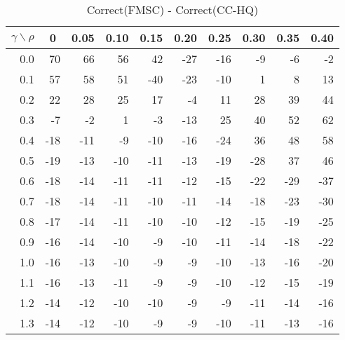 \documentclass[12pt]{article}
\begin{document}
%
\begin{table}[!tbp]
\caption{Correct(FMSC) - Correct(CC-HQ)}
 \begin{center}
 \begin{tabular}{r|rrrrrrrrr}\hline\hline
\multicolumn{1}{c|}{$\gamma\backslash\rho$}&\multicolumn{1}{c}{0}&\multicolumn{1}{c}{0.05}&\multicolumn{1}{c}{0.10}&\multicolumn{1}{c}{0.15}&\multicolumn{1}{c}{0.20}&\multicolumn{1}{c}{0.25}&\multicolumn{1}{c}{0.30}&\multicolumn{1}{c}{0.35}&\multicolumn{1}{c}{0.40}\tabularnewline
\hline



0.0& 70& 66& 56& 42&-27&-16& -9& -6& -2\tabularnewline
0.1& 57& 58& 51&-40&-23&-10&  1&  8& 13\tabularnewline
0.2& 22& 28& 25& 17& -4& 11& 28& 39& 44\tabularnewline
0.3& -7& -2&  1& -3&-13& 25& 40& 52& 62\tabularnewline
0.4&-18&-11& -9&-10&-16&-24& 36& 48& 58\tabularnewline
0.5&-19&-13&-10&-11&-13&-19&-28& 37& 46\tabularnewline
0.6&-18&-14&-11&-11&-12&-15&-22&-29&-37\tabularnewline
0.7&-18&-14&-11&-10&-11&-14&-18&-23&-30\tabularnewline
0.8&-17&-14&-11&-10&-10&-12&-15&-19&-25\tabularnewline
0.9&-16&-14&-10& -9&-10&-11&-14&-18&-22\tabularnewline
1.0&-16&-13&-10& -9& -9&-10&-13&-16&-20\tabularnewline
1.1&-16&-13&-11& -9& -9&-10&-12&-15&-19\tabularnewline
1.2&-14&-12&-10&-10& -9& -9&-11&-14&-16\tabularnewline
1.3&-14&-12&-10& -9& -9&-10&-11&-13&-16\tabularnewline
\hline
\end{tabular}

\end{center}

\end{table}
\end{document}
